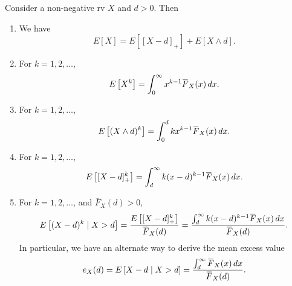 \documentclass[notoc,notitlepage]{tufte-book}
\begin{document}
\begin{propo}\label{propo:expected_value_of_the_policy_adjustments}
  Consider a non-negative rv $X$ and $d > 0$. Then
  \begin{enumerate}
    \item We have
      \begin{equation*}
        E[X] = E[ [ X - d ]_+ ] + E[ X \land d ].
      \end{equation*}
    \item For $k = 1, 2, \ldots$,\label{item:expected_value_of_policy_adjustment_base}
      \begin{equation*}
        E \left[ X^k \right] = \int_{0}^{\infty} x^{k - 1} \bar{F}_X(x) \dif{x}.
      \end{equation*}
    \item For $k = 1, 2, \ldots$,
      \begin{equation*}
        E\left[ ( X \land d )^k \right] = \int_{0}^{d} kx^{k - 1}\bar{F}_X(x) \dif{x} .
      \end{equation*}
    \item For $k = 1, 2, \ldots$,
      \begin{equation*}
        E \left[ [ X - d ]_+^k \right] = \int_{d}^{\infty} k ( x - d )^{k - 1} \bar{F}_X(x) \dif{x}.
      \end{equation*}
    \item For $k = 1, 2, \ldots$, and $\bar{F}_X(d) > 0$,
      \begin{equation*}
        E \left[ ( X - d )^k \mid X > d \right] = \frac{E \left[ [ X - d ]_+^k \right]}{\bar{F}_X(d)} = \frac{\int_{d}^{\infty} k( x -  d )^{k - 1} \bar{F}_X(x) \dif{x} }{\bar{F}_X(d)}.
      \end{equation*}
      In particular, we have an alternate way to derive the mean excess value
      \begin{equation*}
        e_X(d) = E \left[ X - d \mid X > d \right] = \frac{\int_{d}^{\infty} \bar{F}_X(x) \dif{x}}{\bar{F}_X(d)}.
      \end{equation*}
  \end{enumerate}
\end{propo}
\end{document}
